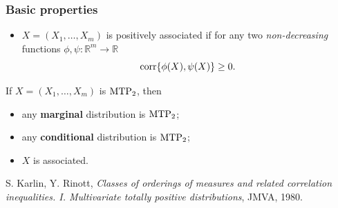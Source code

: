 \documentclass[dvipsnames,aspectratio=169]{beamer} %
\newcommand{\R}{\mathbb{R}}
\newcommand{\indep}{\mbox{\,$\perp\!\!\!\perp$\,}}
\newcommand{\mtp}{{\rm MTP}_{2}}
\begin{document}
\begin{frame}
\frametitle{Basic properties}
	\begin{itemize}
\item $X=(X_{1},\ldots,X_{m})$ is \alert{positively associated} if for any two \textit{non-decreasing} functions $\phi,\psi:\R^m\to \R$
$${\rm corr}\{\phi(X),\psi(X)\}\geq 0.$$
\end{itemize}	
If $X=(X_{1},\ldots,X_{m})$ is $\mtp$, then\\[.3cm]
\begin{itemize}
\item[(i)] any \textbf{marginal} distribution is $\mtp$;\\[.2cm]
\item[(ii)] any  \textbf{conditional} distribution is $\mtp$;\\[.2cm]
\item [(iii)] $X$ is associated.
\end{itemize}
\vspace{.7cm}
{\footnotesize S. Karlin, Y. Rinott, \textit{Classes of orderings of measures and related correlation inequalities. I. Multivariate totally positive distributions}, JMVA, 1980.}
%
 \end{frame}
\end{document}
